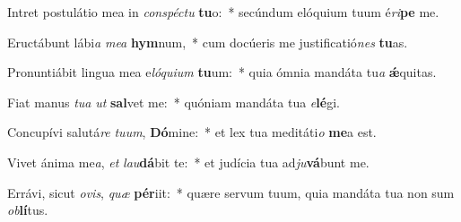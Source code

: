 \item Intret postulátio mea in \textit{con}\textit{spéc}\textit{tu} \textbf{tu}o:~* secúndum elóquium tuum é\textit{ri}\textbf{pe} me.
\item Eructábunt lábi\textit{a} \textit{me}\textit{a} \textbf{hym}num,~* cum docúeris me justificatió\textit{nes} \textbf{tu}as.
\item Pronuntiábit lingua mea e\textit{ló}\textit{qui}\textit{um} \textbf{tu}um:~* quia ómnia mandáta tu\textit{a} \textbf{ǽ}quitas.
\item Fiat manus \textit{tu}\textit{a} \textit{ut} \textbf{sal}vet me:~* quóniam mandáta tua \textit{e}\textbf{lé}gi.
\item Concupívi salutá\textit{re} \textit{tu}\textit{um}, \textbf{Dó}mine:~* et lex tua meditáti\textit{o} \textbf{me}a est.
\item Vivet ánima me\textit{a}, \textit{et} \textit{lau}\textbf{dá}bit te:~* et judícia tua ad\textit{ju}\textbf{vá}bunt me.
\item Errávi, sicut \textit{o}\textit{vis}, \textit{quæ} \textbf{pér}iit:~* quære servum tuum, quia mandáta tua non sum \textit{ob}\textbf{lí}tus.
